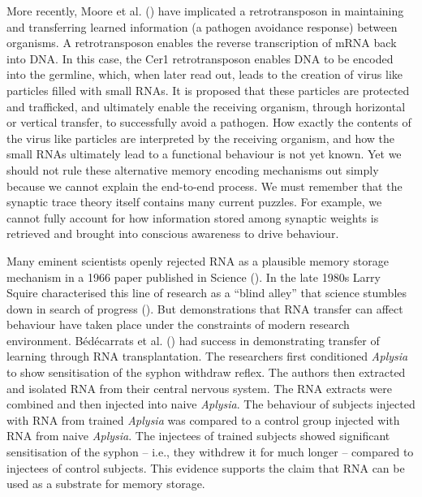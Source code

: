 \documentclass[
  jou,
  floatsintext,
  longtable,
  nolmodern,
  notxfonts,
  notimes,
  donotrepeattitle,
  colorlinks=true,linkcolor=blue,citecolor=blue,urlcolor=blue]{apa7}
\begin{document}
More recently, Moore et al. () have
implicated a retrotransposon in maintaining and transferring learned
information (a pathogen avoidance response) between organisms. A
retrotransposon enables the reverse transcription of mRNA back into DNA.
In this case, the Cer1 retrotransposon enables DNA to be encoded into
the germline, which, when later read out, leads to the creation of virus
like particles filled with small RNAs. It is proposed that these
particles are protected and trafficked, and ultimately enable the
receiving organism, through horizontal or vertical transfer, to
successfully avoid a pathogen. How exactly the contents of the virus
like particles are interpreted by the receiving organism, and how the
small RNAs ultimately lead to a functional behaviour is not yet known.
Yet we should not rule these alternative memory encoding mechanisms out
simply because we cannot explain the end-to-end process. We must
remember that the synaptic trace theory itself contains many current
puzzles. For example, we cannot fully account for how information stored
among synaptic weights is retrieved and brought into conscious awareness
to drive behaviour.

Many eminent scientists openly rejected RNA as a plausible memory
storage mechanism in a 1966 paper published in Science
(). In the late
1980s Larry Squire characterised this line of research as a ``blind
alley'' that science stumbles down in search of progress
(). But
demonstrations that RNA transfer can affect behaviour have taken place
under the constraints of modern research environment. Bédécarrats et al.
() had success in demonstrating
transfer of learning through RNA transplantation. The researchers first
conditioned \emph{Aplysia} to show sensitisation of the syphon withdraw
reflex. The authors then extracted and isolated RNA from their central
nervous system. The RNA extracts were combined and then injected into
naive \emph{Aplysia}. The behaviour of subjects injected with RNA from
trained \emph{Aplysia} was compared to a control group injected with RNA
from naive \emph{Aplysia}. The injectees of trained subjects showed
significant sensitisation of the syphon -- i.e., they withdrew it for
much longer -- compared to injectees of control subjects. This evidence
supports the claim that RNA can be used as a substrate for memory
storage.
\end{document}
